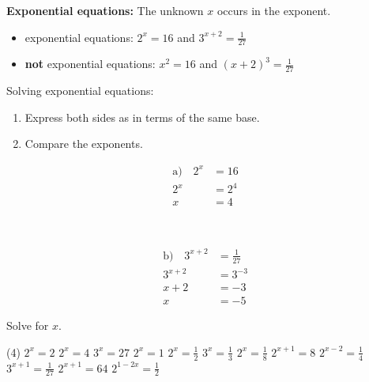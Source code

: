 \begin{tcolorbox}
	\textbf{Exponential equations:} The unknown $x$ occurs in the exponent.
	\begin{itemize}
		\item exponential equations: $2^x=16$ and $3^{x+2}=\frac{1}{27}$
		\item \textbf{not} exponential equations: $x^2=16$ and $\left(x+2\right)^3=\frac{1}{27}$
	\end{itemize}
	Solving exponential equations:
	\begin{enumerate}[Step 1:]
		\item Express both sides as in terms of the same base.
		\item Compare the exponents.
	\end{enumerate}
\end{tcolorbox}
\begin{exampleenv}
\begin{example}
	\begin{minipage}{0.45\textwidth}
		\begin{align*}
			\textrm{a)}\quad 2^x&=16 \\
			2^x&=2^4 \\
			x&=4 \\
			\phantom{x+2}& \\
			\phantom{x+2}&
		\end{align*}
	\end{minipage}\hfill
	\begin{minipage}{0.45\textwidth}
		\begin{align*}
			\textrm{b)}\quad 3^{x+2}&=\frac{1}{27} \\
			3^{x+2}&=3^{-3} \\
			x+2&=-3 \\
			x&=-5
		\end{align*}
	\end{minipage}
\end{example}
\end{exampleenv}
\begin{exercise}
	Solve for $x$.
	\begin{tasks}(4)
		\task $2^x=2$ \task $2^x=4$ \task $3^x=27$ \task $2^x=1$
		\task $2^x=\frac{1}{2}$ \task $3^x=\frac{1}{3}$ \task $2^x=\frac{1}{8}$ \task $2^{x+1}=8$
		\task $2^{x-2}=\frac{1}{4}$ \task $3^{x+1}=\frac{1}{27}$ \task $2^{x+1}=64$
		\task $2^{1-2x}=\frac{1}{2}$
	\end{tasks}
\end{exercise}
